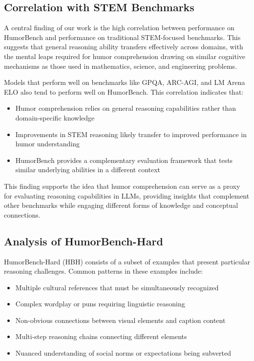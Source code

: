 \documentclass[twocolumn]{article}
\begin{document}
\subsection{Correlation with STEM Benchmarks}

A central finding of our work is the high correlation between performance on HumorBench and performance on traditional STEM-focused benchmarks. This suggests that general reasoning ability transfers effectively across domains, with the mental leaps required for humor comprehension drawing on similar cognitive mechanisms as those used in mathematics, science, and engineering problems.

Models that perform well on benchmarks like GPQA, ARC-AGI, and LM Arena ELO also tend to perform well on HumorBench. This correlation indicates that:

\begin{itemize}
    \item Humor comprehension relies on general reasoning capabilities rather than domain-specific knowledge
    \item Improvements in STEM reasoning likely transfer to improved performance in humor understanding
    \item HumorBench provides a complementary evaluation framework that tests similar underlying abilities in a different context
\end{itemize}

This finding supports the idea that humor comprehension can serve as a proxy for evaluating reasoning capabilities in LLMs, providing insights that complement other benchmarks while engaging different forms of knowledge and conceptual connections.


\subsection{Analysis of HumorBench-Hard}

HumorBench-Hard (HBH) consists of a subset of examples that present particular reasoning challenges. Common patterns in these examples include:

\begin{itemize}
    \item Multiple cultural references that must be simultaneously recognized
    \item Complex wordplay or puns requiring linguistic reasoning
    \item Non-obvious connections between visual elements and caption content
    \item Multi-step reasoning chains connecting different elements
    \item Nuanced understanding of social norms or expectations being subverted
\end{itemize}
\end{document}
